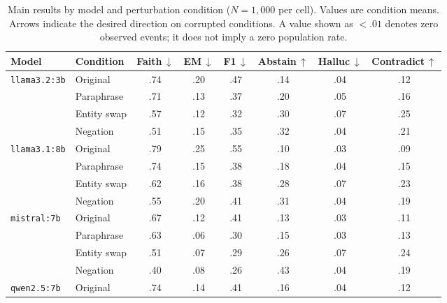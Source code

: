 \documentclass[11pt]{article}
\begin{document}
\begin{table}[ht]
\centering
\caption{Main results by model and perturbation condition ($N=1{,}000$ per cell).
  Values are condition means. Arrows indicate the desired direction on corrupted
  conditions. A value shown as $<.01$ denotes zero observed events; it does not imply
  a zero population rate.}
\label{tab:main-results}
\small
\renewcommand{\arraystretch}{1.15}
\begin{tabular}{llcccccc}
\toprule
\textbf{Model} & \textbf{Condition}
  & \textbf{Faith\,$\downarrow$}
  & \textbf{EM\,$\downarrow$}
  & \textbf{F1\,$\downarrow$}
  & \textbf{Abstain\,$\uparrow$}
  & \textbf{Halluc\,$\downarrow$}
  & \textbf{Contradict\,$\uparrow$} \\
\midrule
\multirow{4}{*}{\texttt{llama3.2:3b}}
  & Original    & .74        & .20        & .47        & .14        & .04        & .12 \\
  & Paraphrase  & .71        & .13        & .37        & .20        & .05        & .16 \\
  & Entity swap & .57        & .12        & .32        & .30        & .07        & .25 \\
  & Negation    & .51        & .15        & .35        & .32        & .04        & .21 \\
\midrule
\multirow{4}{*}{\texttt{llama3.1:8b}}
  & Original    & .79        & .25        & .55        & .10        & .03        & .09 \\
  & Paraphrase  & .74        & .15        & .38        & .18        & .04        & .15 \\
  & Entity swap & .62        & .16        & .38        & .28        & .07        & .23 \\
  & Negation    & .55        & .20        & .41        & .31        & .04        & .19 \\
\midrule
\multirow{4}{*}{\texttt{mistral:7b}}
  & Original    & .67        & .12        & .41        & .13        & .03        & .11 \\
  & Paraphrase  & .63        & .06        & .30        & .15        & .03        & .13 \\
  & Entity swap & .51        & .07        & .29        & .26        & .07        & .24 \\
  & Negation    & .40        & .08        & .26        & .43        & .04        & .19 \\
\midrule
\multirow{4}{*}{\texttt{qwen2.5:7b}}
  & Original    & .74        & .14        & .41        & .16        & .04        & .12 \\

\end{tabular}
\end{table}
\end{document}

